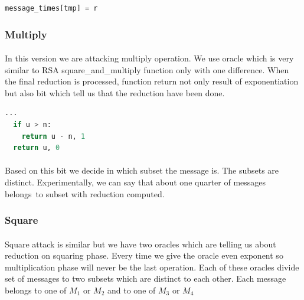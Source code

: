 \documentclass[thesis=B,english]{FITthesis}[2012/10/20]
\begin{document}
{{\begin{minipage}{\linewidth}
\begin{lstlisting}[language=Python]
    message_times[tmp] = r
\end{lstlisting}

\end{minipage}

\subsubsection{Multiply}
\paragraph*{}{
In this version we are attacking multiply operation. We use oracle which is very similar to RSA square\_and\_multiply function only with one difference.
When the final reduction is processed, function return not only result of exponentiation but also bit which tell us that the reduction have been done.}
\begin{minipage}{\linewidth}
\begin{lstlisting}[language=Python]
  ...
  if u > n:
    return u - n, 1
  return u, 0
\end{lstlisting}
\end{minipage}

\paragraph*{}
{
Based on this bit we decide in which subset the message is. The subsets are distinct. Experimentally, we can say that about one quarter of messages belongs~to
subset with reduction computed.
}
\subsubsection{Square}
\paragraph*{}{
Square attack is similar but we have two oracles which are telling us about reduction on squaring phase. Every time we give the oracle even exponent so 
multiplication phase will never be the last operation. Each of these oracles divide set of messages to two subsets which are distinct to each other. Each message 
belongs to one of \(M_1\) or \(M_2\) and to one of \(M_3\) or \(M_4\)
}

}}
\end{document}
